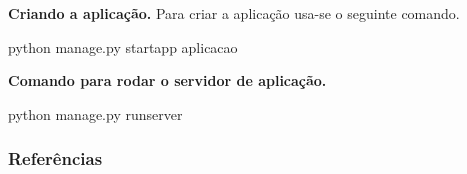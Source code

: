 \documentclass[18pt]{beamer}
\begin{document}
\begin{frame}{\fontsize{20pt}{20}\selectfont \textbf{Criando a aplicação.}}
  Para criar a aplicação usa-se o seguinte comando.

  python manage.py startapp aplicacao


\end{frame}


\begin{frame}[allowframebreaks] {\fontsize{20pt}{20}\selectfont \textbf{Comando para rodar o servidor de aplicação.}}

  python manage.py runserver

\end{frame}

\nocite{*}
\begin{frame}[allowframebreaks] 
\frametitle{\fontsize{20pt}{20}\selectfont \textbf{Referências}}
{\scriptsize


}
\end{frame}



\end{document}
